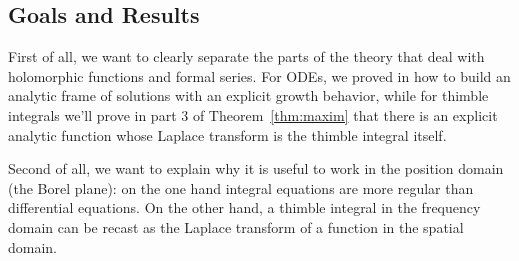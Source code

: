 \documentclass{article}
\theoremstyle{definition}
\newcommand{\laplace}{\mathcal{L}}
\newcommand{\borel}{\mathcal{B}}
\theoremstyle{plain}
\begin{document}



\subsection{Goals and Results}

First of all, we want to clearly separate the parts of the theory that deal with holomorphic functions and formal series. For ODEs, we proved in \cite[Theorem~4]{reg-sing-volterra} how to build an analytic frame of solutions with an explicit growth behavior, while for thimble integrals we'll prove in part 3 of Theorem~\ref{thm:maxim} that there is an explicit analytic function whose Laplace transform is the thimble integral itself. 

Second of all, we want to explain why it is useful to work in the position domain (the Borel plane): on the one hand integral equations are more regular than differential equations. On the other hand, a thimble integral in the frequency domain can be recast as the Laplace transform of a function in the spatial domain. 
\end{document}
